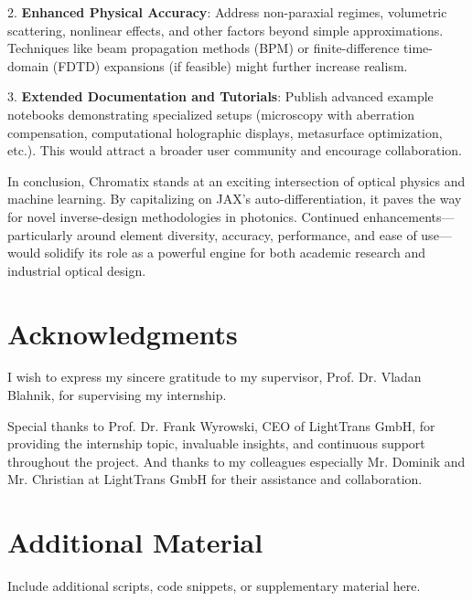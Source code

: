 \documentclass[a4paper,12pt]{report}
\begin{document}
\vspace{0.5em}
2. \textbf{Enhanced Physical Accuracy}: Address non-paraxial regimes, volumetric scattering, nonlinear effects, and other factors beyond simple approximations. Techniques like beam propagation methods (BPM) or finite-difference time-domain (FDTD) expansions (if feasible) might further increase realism.

\vspace{0.5em}
3. \textbf{Extended Documentation and Tutorials}: Publish advanced example notebooks demonstrating specialized setups (microscopy with aberration compensation, computational holographic displays, metasurface optimization, etc.). This would attract a broader user community and encourage collaboration.

\vspace{0.5em}
In conclusion, Chromatix stands at an exciting intersection of optical physics and machine learning. By capitalizing on JAX's auto-differentiation, it paves the way for novel inverse-design methodologies in photonics. Continued enhancements—particularly around element diversity, accuracy, performance, and ease of use—would solidify its role as a powerful engine for both academic research and industrial optical design.

\chapter{Acknowledgments}
I wish to express my sincere gratitude to my supervisor, Prof. Dr. Vladan Blahnik, for supervising my internship. 

Special thanks to Prof. Dr. Frank Wyrowski, CEO of LightTrans GmbH, for providing the internship topic, invaluable insights, and continuous support throughout the project. And thanks to my colleagues especially  Mr. Dominik and Mr. Christian at LightTrans GmbH for their assistance and collaboration.






\appendix
\chapter{Additional Material}
Include additional scripts, code snippets, or supplementary material here.
\end{document}
